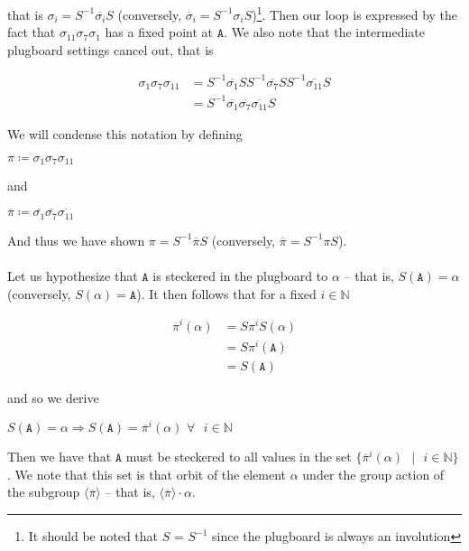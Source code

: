 \noindent that is $\sigma_i = S^{-1}\overline{\sigma_i}S$
(conversely, $\overline\sigma_i = S^{-1}\sigma_iS$)\footnote{It
	should be noted that $S$ = $S^{-1}$ since the plugboard is always an
	involution}.
Then our loop is expressed by the fact that
$\sigma_{11}\sigma_7\sigma_1$ has a fixed point at $\texttt{A}$.
We also note that the intermediate plugboard settings cancel out, that is
\begin{center}
	\begin{align*}
		\sigma_{1}\sigma_7\sigma_{11} & =
		S^{-1}\overline{\sigma_{1}}SS^{-1}\overline{\sigma_7}SS^{-1}\overline{\sigma_{11}}S
		\\&= S^{-1}
		\overline{\sigma_{1}}\overline{\sigma_7}\overline{\sigma_{11}}
		S
	\end{align*}
\end{center}
We will condense this notation by defining
\begin{center}
	$\pi \coloneq \sigma_{1}\sigma_7\sigma_{11}$
\end{center}
and
\begin{center}
	$\overline{\pi} \coloneq
		\overline{\sigma_{1}}\overline{\sigma_7}\overline{\sigma_{11}}$
\end{center}
And thus we have shown $\pi = S^{-1}\overline{\pi}S$ (conversely,
$\overline\pi = S^{-1}\pi S$).
\\\\Let us hypothesize that $\texttt{A}$ is steckered in the plugboard to
$\alpha$ -- that is, $S(\texttt{A}) = \alpha$ (conversely, $S(\alpha)
	= \texttt{A}$).
It then follows that for a fixed $i\in\mathbb{N}$
\begin{center}
	\begin{align*}
		\overline{\pi}^i(\alpha) & = S\pi^i S(\alpha)
		\\&= S \pi^i(\texttt{A})
		\\&= S(\texttt{A})
	\end{align*}
\end{center}
and so we derive
\begin{center}
	$S(\texttt{A}) = \alpha \Rightarrow S(\texttt{A}) =
		\overline{\pi}^i(\alpha)\text{
		}\forall\text{ }i\in\mathbb{N}$
\end{center}
Then we have that $\texttt{A}$ must be steckered to all values in the set
$\{\overline{\pi}^i(\alpha)\text{ }\vert\text{ }i\in\mathbb{N}\}$.
We note that this set is that orbit of the element $\alpha$ under the
group action of the subgroup $\langle\overline{\pi}\rangle$ -- that is,
$\langle\overline{\pi}\rangle\cdot\alpha$.
